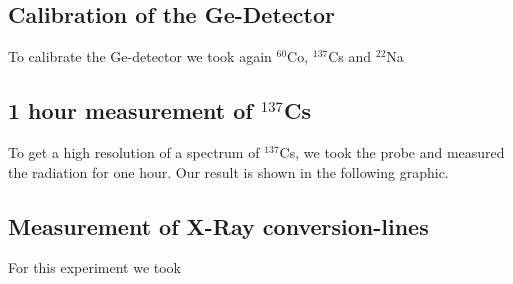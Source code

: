 \subsection{Calibration of the Ge-Detector}
To calibrate the Ge-detector we took again $^{60}$Co, $^{137}$Cs and $^{22}$Na

\subsection{1 hour measurement of $^{137}$Cs}
To get a high resolution of a spectrum of $^{137}$Cs, we took the probe and measured the radiation for one hour. Our result is shown in the following graphic.


\subsection{Measurement of X-Ray conversion-lines}
For this experiment we took 